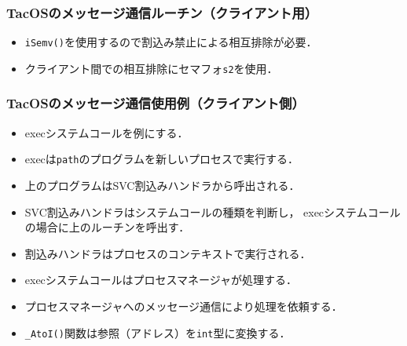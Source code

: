 \documentclass{beamer}                   %
\begin{document}
\begin{frame}
  \frametitle{TacOSのメッセージ通信ルーチン（クライアント用）}
  
  \begin{itemize}
  \item {\tt iSemv()}を使用するので割込み禁止による相互排除が必要．
  \item クライアント間での相互排除にセマフォ{\tt s2}を使用．
  \end{itemize}
\end{frame}

\begin{frame}
  \frametitle{TacOSのメッセージ通信使用例（クライアント側）}
  
  \begin{itemize}
  \item execシステムコールを例にする．
  \item execは{\tt path}のプログラムを新しいプロセスで実行する．
  \item 上のプログラムはSVC割込みハンドラから呼出される．
  \item SVC割込みハンドラはシステムコールの種類を判断し，
    execシステムコールの場合に上のルーチンを呼出す．
  \item 割込みハンドラはプロセスのコンテキストで実行される．
  \item execシステムコールはプロセスマネージャが処理する．
  \item プロセスマネージャへのメッセージ通信により処理を依頼する．
  \item {\tt \_AtoI()}関数は参照（アドレス）を{\tt int}型に変換する．
  \end{itemize}
\end{frame}
\end{document}
